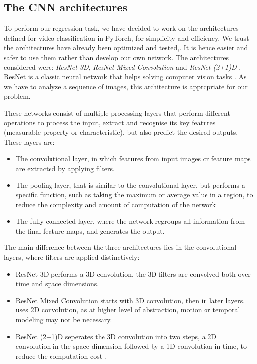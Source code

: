 \documentclass[10pt,conference]{IEEEtran}
\begin{document}
\subsection{The CNN architectures}
To perform our regression task, we have decided to work on the architectures defined for video classification in PyTorch, for simplicity and efficiency. We trust the architectures have already been optimized and tested,. It is hence easier and safer to use them rather than develop our own network. The architectures considered were: \textit{ResNet 3D}, \textit{ResNet Mixed Convolution} and \textit{ResNet (2+1)D} \cite{resnets}. ResNet is a classic neural network that helps solving computer vision tasks \cite{hara3dcnns}. As we have to analyze a sequence of images, this architecture is appropriate for our problem.\par
These networks consist of multiple processing layers that perform different operations to process the input, extract and recognise its key features (measurable property or characteristic), but also predict the desired outputs. These layers are:
\begin{itemize}
  \item The convolutional layer, in which features from input images or feature maps are extracted by applying filters.
  \item The pooling layer, that is similar to the convolutional layer, but performs a specific function, such as taking the maximum or average value in a region, to reduce the complexity and amount of computation of the network 
  \item The fully connected layer, where the network regroups all information from the final feature maps, and generates the output.
\end{itemize}

The main difference between the three architectures lies in the convolutional layers, where filters are applied distinctively:
\begin{itemize}
  \item ResNet 3D performs a 3D convolution, the 3D filters are convolved both over time and space dimensions.
  \item ResNet Mixed Convolution starts with 3D convolution, then in later layers, uses 2D convolution, as at higher level of abstraction, motion or temporal modeling may not be necessary.
  \item ResNet (2+1)D seperates the 3D convolution into two steps, a 2D convolution in the space dimension followed by a 1D convolution in time, to reduce the computation cost \cite{spacetimeconv}.
\end{itemize}
\end{document}
